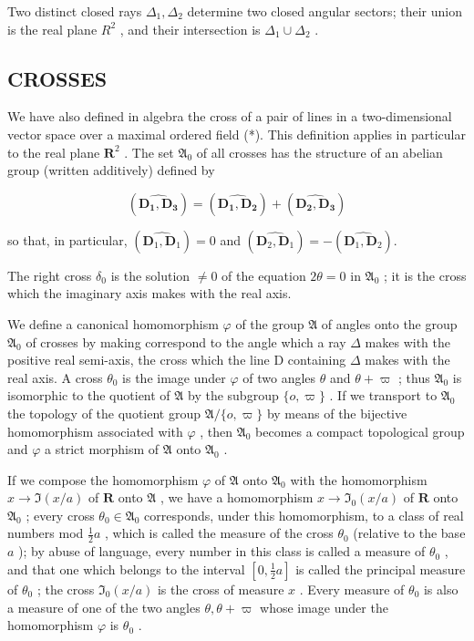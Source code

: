 Two distinct closed rays \(\Delta_{1}, \Delta_{2}\) determine two closed angular sectors; their union is the real plane \(R^{2}\) , and their intersection is \(\Delta_{1} \cup \Delta_{2}\) .

\subsection{CROSSES}

We have also defined in algebra the cross of a pair of lines in a two-dimensional vector space over a maximal ordered field (*). This definition applies in particular to the real plane \(\mathbf{R}^2\) . The set \(\mathfrak{A}_0\) of all crosses has the structure of an abelian group (written additively) defined by

\[
(\widehat {\mathbf {D _ {1} , D _ {3}}}) = (\widehat {\mathbf {D _ {1} , D _ {2}}}) + (\widehat {\mathbf {D _ {2} , D _ {3}}})
\]

so that, in particular, \((\widehat{\mathbf{D}_1,\mathbf{D}_1}) = 0\) and \((\widehat{\mathbf{D}_2,\mathbf{D}_1}) = -(\widehat{\mathbf{D}_1,\mathbf{D}_2}).\)

The right cross \(\delta_0\) is the solution \(\neq 0\) of the equation \(2\theta = 0\) in \(\mathfrak{A}_0\) ; it is the cross which the imaginary axis makes with the real axis.

We define a canonical homomorphism \(\varphi\) of the group \(\mathfrak{A}\) of angles onto the group \(\mathfrak{A}_0\) of crosses by making correspond to the angle which a ray \(\Delta\) makes with the positive real semi-axis, the cross which the line D containing \(\Delta\) makes with the real axis. A cross \(\theta_0\) is the image under \(\varphi\) of two angles \(\theta\) and \(\theta + \varpi\) ; thus \(\mathfrak{A}_0\) is isomorphic to the quotient of \(\mathfrak{A}\) by the subgroup \(\{o, \varpi\}\) . If we transport to \(\mathfrak{A}_0\) the topology of the quotient group \(\mathfrak{A}/\{o, \varpi\}\) by means of the bijective homomorphism associated with \(\varphi\) , then \(\mathfrak{A}_0\) becomes a compact topological group and \(\varphi\) a strict morphism of \(\mathfrak{A}\) onto \(\mathfrak{A}_0\) .

If we compose the homomorphism \(\varphi\) of \(\mathfrak{A}\) onto \(\mathfrak{A}_0\) with the homomorphism \(x \to \Im(x/a)\) of \(\mathbf{R}\) onto \(\mathfrak{A}\) , we have a homomorphism \(x \to \Im_0(x/a)\) of \(\mathbf{R}\) onto \(\mathfrak{A}_0\) ; every cross \(\theta_0 \in \mathfrak{A}_0\) corresponds, under this homomorphism, to a class of real numbers mod \(\frac{1}{2}a\) , which is called the measure of the cross \(\theta_0\) (relative to the base \(a\) ); by abuse of language, every number in this class is called a measure of \(\theta_0\) , and that one which belongs to the interval \([0, \frac{1}{2}a]\) is called the principal measure of \(\theta_0\) ; the cross \(\Im_0(x/a)\) is the cross of measure \(x\) . Every measure of \(\theta_0\) is also a measure of one of the two angles \(\theta, \theta + \varpi\) whose image under the homomorphism \(\varphi\) is \(\theta_0\) .

